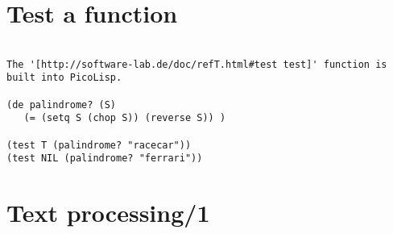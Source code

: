 \section*{Test a function}

\begin{verbatim}

The '[http://software-lab.de/doc/refT.html#test test]' function is
built into PicoLisp.

(de palindrome? (S)
   (= (setq S (chop S)) (reverse S)) )

(test T (palindrome? "racecar"))
(test NIL (palindrome? "ferrari"))

\end{verbatim}

\section*{Text processing/1}

